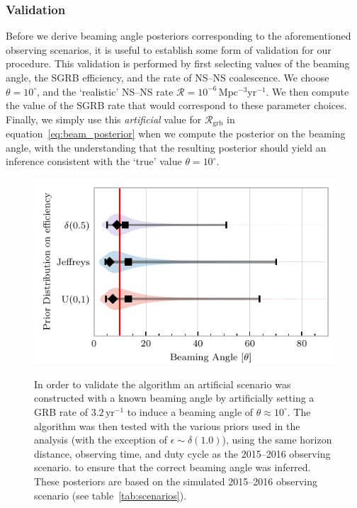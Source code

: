 \documentclass[twocolumn,nofootinbib]{revtex4-1}
\newcommand{\grbrate}{{{\mathcal R}_{\mathrm{grb}}}}
\newcommand{\cbcrate}{{{\mathcal R}}}
\newcommand{\yr}{\mathrm{yr}}
\newcommand{\BNS}{\ac{NS}--\ac{NS}\xspace}
\begin{document}
\subsubsection{Validation}
Before we derive beaming angle posteriors corresponding to the
aforementioned observing scenarios, it is useful to establish some
form of validation for our procedure.  This validation is performed by
first selecting values of the beaming angle, the \ac{SGRB} efficiency,
and the rate of \BNS coalescence.  We choose $\theta=10^{\circ}$, and
the `realistic' \BNS rate $\cbcrate = 10^{-6}$\,Mpc$^{-3}$yr$^{-1}$.
We then compute the value of the \ac{SGRB} rate that would correspond
to these parameter choices.  Finally, we simply use this
\emph{artificial} value for $\grbrate$ in
equation~\ref{eq:beam_posterior} when we compute the posterior on the
beaming angle, with the understanding that the resulting posterior
should yield an inference consistent with the `true' value
$\theta=10^{\circ}$.
%
\begin{figure}%
\centering
{\includegraphics[width=\linewidth]{O1_injections_violin.pdf}}
\caption{ In order to validate the algorithm an artificial scenario
  was constructed with a known beaming angle by artificially setting a
  GRB rate of $3.2\, \yr^{-1}$ to induce a beaming angle of $\theta \approx 10^{\circ}$.
  The algorithm was then tested with the various priors used in the
  analysis (with the exception of $\epsilon \sim \delta(1.0)$), using
  the same horizon distance, observing time, and duty cycle as the 2015--2016
  observing scenario. to ensure that the correct beaming angle was inferred. 
  These posteriors are based on the simulated 2015--2016 observing scenario (see
  table~\ref{tab:scenarios}).
  \label{fig:injjetposterio2016}}
\end{figure}
\end{document}
